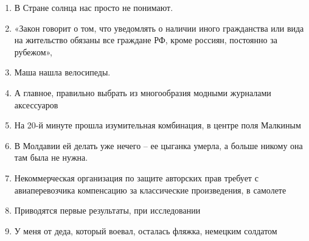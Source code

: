 \documentclass[paper=a4, fontsize=11pt]{scrartcl}
\begin{document}
\begin{enumerate}
    \item В Стране \raisebox{-\baselineskip}{\shortstack{\underline{\hspace{5cm}}\\nouseva}} солнца нас просто не понимают.
    \item «Закон говорит о том, что уведомлять о наличии иного гражданства или вида на жительство обязаны все граждане РФ, кроме россиян, постоянно  \raisebox{-\baselineskip}{\shortstack{\underline{\hspace{5cm}}\\asuvat}} за рубежом»,
    \item Маша нашла \raisebox{-\baselineskip}{\shortstack{\underline{\hspace{5cm}}\\varastetut}} велосипеды.
    \item А главное, правильно выбрать из многообразия   модными журналами аксессуаров
    \item На 20-й минуте прошла изумительная комбинация, \raisebox{-\baselineskip}{\shortstack{\underline{\hspace{5cm}}\\aloitettu}} в центре поля Малкиным
    \item В Молдавии ей делать уже нечего --  \raisebox{-\baselineskip}{\shortstack{\underline{\hspace{5cm}}\\kasvattanut}} ее цыганка умерла, а больше никому она там была не нужна.
    \item Некоммерческая организация по защите авторских прав требует с авиаперевозчика компенсацию за классические произведения,  \raisebox{-\baselineskip}{\shortstack{\underline{\hspace{5cm}}\\soivat}} в самолете
    \item Приводятся первые результаты, \raisebox{-\baselineskip}{\shortstack{\underline{\hspace{5cm}}\\saadut}} при исследовании
    \item У меня от деда, который воевал, осталась фляжка,  \raisebox{-\baselineskip}{\shortstack{\underline{\hspace{5cm}}\\lahjoitettu}} немецким солдатом

\end{enumerate}
\end{document}
